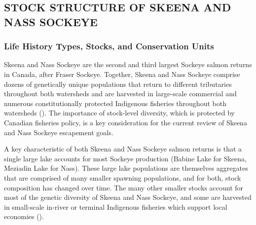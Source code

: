 \documentclass[french,11pt]{book}
\begin{document}
\subsection{STOCK STRUCTURE OF SKEENA AND NASS SOCKEYE}\label{stock-structure-of-skeena-and-nass-sockeye}

\subsubsection{Life History Types, Stocks, and Conservation Units}\label{life-history-types-stocks-and-conservation-units}

Skeena and Nass Sockeye are the second and third largest Sockeye salmon returns in Canada, after Fraser Sockeye. Together, Skeena and Nass Sockeye comprise dozens of genetically unique populations that return to different tributaries throughout both watersheds and are harvested in large-scale commercial and numerous constitutionally protected Indigenous fisheries throughout both watersheds (). The importance of stock-level diversity, which is protected by Canadian fisheries policy, is a key consideration for the current review of Skeena and Nass Sockeye escapement goals.

A key characteristic of both Skeena and Nass Sockeye salmon returns is that a single large lake accounts for most Sockeye production (Babine Lake for Skeena, Meziadin Lake for Nass). These large lake populations are themselves aggregates that are comprised of many smaller spawning populations, and for both, stock composition has changed over time. The many other smaller stocks account for most of the genetic diversity of Skeena and Nass Sockeye, and some are harvested in small-scale in-river or terminal Indigenous fisheries which support local economies ().
\end{document}
